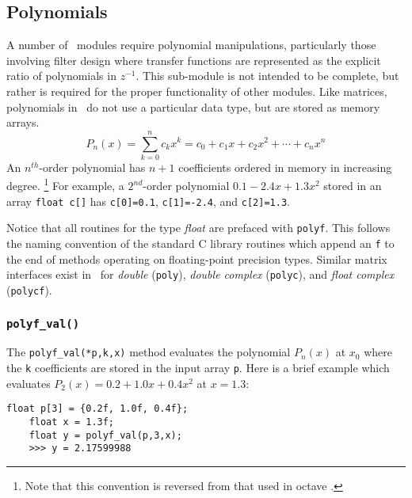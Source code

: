 % 
%
\subsection{Polynomials}
\label{module:math:poly}
A number of \liquid\ modules require polynomial manipulations, particularly
those involving filter design where transfer functions are represented as the
explicit ratio of polynomials in $z^{-1}$.
This sub-module is not intended to be complete, but rather is required for
the proper functionality of other modules.
Like matrices, polynomials in \liquid\ do not use a particular data type, but
are stored as memory arrays.
%
\begin{equation}
\label{eqn:math:poly:representation}
    P_n(x) = \sum_{k=0}^{n}{c_k x^k}
           = c_0 + c_1 x + c_2 x^2 + \cdots + c_n x^n
\end{equation}
%
An $n^{th}$-order polynomial has $n+1$ coefficients ordered in memory in
increasing degree.%
\footnote{Note that this convention is reversed from that used in octave
\cite{octave:web}.}
For example, a $2^{nd}$-order polynomial $0.1 -2.4x + 1.3x^2$ stored in
an array {\tt float c[]} has
{\tt c[0]=0.1},
{\tt c[1]=-2.4}, and
{\tt c[2]=1.3}.

Notice that all routines for the type {\it float} are prefaced with
{\tt polyf}.
This follows the naming convention of the standard C library routines
which append an {\tt f} to the end of methods operating on
floating-point precision types.
Similar matrix interfaces exist in \liquid\ for
{\it double} ({\tt poly}),
{\it double complex} ({\tt polyc}), and
{\it float complex} ({\tt polycf}).


\subsubsection{{\tt polyf\_val()}}
\label{module:math:poly:polyf_val}
The {\tt polyf\_val(*p,k,x)} method evaluates the polynomial $P_n(x)$ at
$x_0$ where the {\tt k} coefficients are stored in the input array
{\tt p}.
Here is a brief example which evaluates $P_2(x) = 0.2 + 1.0x + 0.4x^2$
at $x=1.3$:
%
\begin{Verbatim}[fontsize=\small]
    float p[3] = {0.2f, 1.0f, 0.4f};
    float x = 1.3f;
    float y = polyf_val(p,3,x);
    >>> y = 2.17599988
\end{Verbatim}

